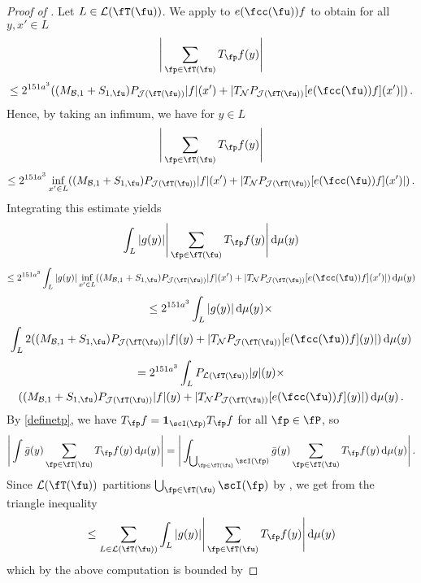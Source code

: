 \begin{proof}[Proof of ]
    Let $L \in \mathcal{L}(\fT(\fu))$.
    We apply  to $e(\fcc(\fu)) f$ to obtain for all $y, x' \in L$
    $$
        \Bigg| \sum_{\fp \in \fT(\fu)} T_{\fp} f(y) \Bigg|
    $$
    $$
        \le 2^{151a^3} ((M_{\mathcal{B},1}+S_{1,\fu})P_{\mathcal{J}(\fT(\fu))}|f|(x')+|T_{\mathcal{N}}P_{\mathcal{J}(\fT(\fu))}[e(\fcc(\fu))f](x')| )\,.
    $$
    Hence, by taking an infimum, we have for $y \in L$
    $$
        \Bigg| \sum_{\fp \in \fT(\fu)} T_{\fp} f(y) \Bigg|
    $$
    $$
        \le 2^{151a^3} \inf_{x' \in L} ((M_{\mathcal{B},1}+S_{1,\fu})P_{\mathcal{J}(\fT(\fu))}|f|(x')+|T_{\mathcal{N}}P_{\mathcal{J}(\fT(\fu))}[e(\fcc(\fu))f](x')| )\,.
    $$
    Integrating this estimate yields
    $$
        \int_L |g(y)| \Bigg| \sum_{\fp \in \fT(\fu)} T_{\fp} f(y) \Bigg| \, \mathrm{d}\mu(y)
    $$
    $$
        \le 2^{151a^3} \int_L |g(y)| \inf_{x' \in L}((M_{\mathcal{B},1}+S_{1,\fu})P_{\mathcal{J}(\fT(\fu))}|f|(x')+|T_{\mathcal{N}}P_{\mathcal{J}(\fT(\fu))}[e(\fcc(\fu))f](x')| ) \, \mathrm{d}\mu(y)
    $$
    \begin{multline*}
        \le 2^{151a^3} \int_L |g(y)| \, \mathrm{d}\mu(y)\times\\
         \int_L 2((M_{\mathcal{B},1}+S_{1,\fu})P_{\mathcal{J}(\fT(\fu))}|f|(y)+|T_{\mathcal{N}}P_{\mathcal{J}(\fT(\fu))}[e(\fcc(\fu))f](y)| ) \, \mathrm{d}\mu(y)
    \end{multline*}
    \begin{multline*}
        = 2^{151a^3 } \int_L P_{\mathcal{L}(\fT(\fu))}|g|(y)\times \\((M_{\mathcal{B},1}+S_{1,\fu})P_{\mathcal{J}(\fT(\fu))}|f|(y)+|T_{\mathcal{N}}P_{\mathcal{J}(\fT(\fu))}[e(\fcc(\fu))f](y)| ) \, \mathrm{d}\mu(y)\,.
    \end{multline*}
    By \eqref{definetp}, we have $T_{\fp} f = \mathbf{1}_{\scI(\fp)} T_{\fp} f$ for all $\fp \in \fP$, so
    $$
        \Bigg| \int \bar g(y) \sum_{\fp \in \fT(\fu)} T_{\fp} f(y) \, \mathrm{d}\mu(y) \Bigg| = \Bigg| \int_{\bigcup_{\fp \in \fT(\fu)} \scI(\fp)} \bar g(y) \sum_{\fp \in \fT(\fu)} T_{\fp} f(y) \, \mathrm{d}\mu(y) \Bigg|\,.
    $$
    Since $\mathcal{L}(\fT(\fu))$ partitions $\bigcup_{\fp \in \fT(\fu)} \scI(\fp)$ by ,
    we get from the triangle inequality
    $$
        \le \sum_{L \in \mathcal{L}(\fT(\fu))} \int_L |g(y)| \Bigg| \sum_{\fp \in \fT(\fu)} T_{\fp} f(y) \Bigg| \, \mathrm{d}\mu(y)
    $$
    which by the above computation is bounded by

\end{proof}
